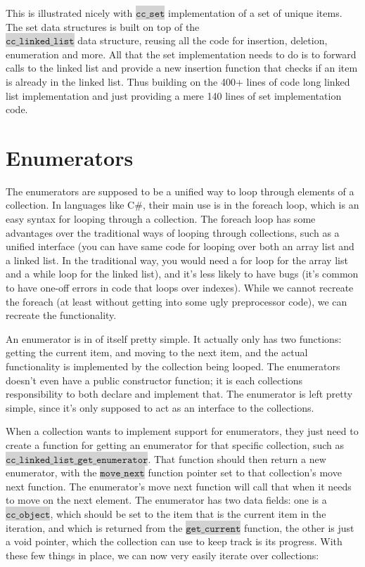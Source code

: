 \documentclass[table]{ituthesis}
\newcommand{\highlight}[1]{\colorbox{lightGray}{$\displaystyle \texttt{#1}$}}
\begin{document}
This is illustrated nicely with \highlight{cc\_set} implementation of a set of unique items. The set data structures is built on top of the \\\highlight{cc\_linked\_list} data structure, reusing all the code for insertion, deletion, enumeration and more. All that the set implementation needs to do is to forward calls to the linked list and provide a new insertion function that checks if an item is already in the linked list. Thus building on the 400+ lines of code long linked list implementation and just providing a mere 140 lines of set implementation code.

\section{Enumerators}

	The enumerators are supposed to be a unified way to loop through elements of a collection. In languages like C\#, their main use is in the foreach loop, which is an easy syntax for looping through a collection. The foreach loop has some advantages over the traditional ways of looping through collections, such as a unified interface (you can have same code for looping over both an array list and a linked list. In the traditional way, you would need a for loop for the array list and a while loop for the linked list), and it's less likely to have bugs (it's common to have one-off errors in code that loops over indexes). While we cannot recreate the foreach (at least without getting into some ugly preprocessor code), we can recreate the functionality.

	An enumerator is in of itself pretty simple. It actually only has two functions: getting the current item, and moving to the next item, and the actual functionality is implemented by the collection being looped. The enumerators doesn't even have a public constructor function; it is each collections responsibility to both declare and implement that. The enumerator is left pretty simple, since it's only supposed to act as an interface to the collections.

	When a collection wants to implement support for enumerators, they just need to create a function for getting an enumerator for that specific collection, such as \highlight{cc\_linked\_list\_get\_enumerator}. That function should then return a new enumerator, with the \highlight{move\_next} function pointer set to that collection's move next function. The enumerator's move next function will call that when it needs to move on the next element. The enumerator has two data fields: one is a \highlight{cc\_object}, which should be set to the item that is the current item in the iteration, and which is returned from the \highlight{get\_current} function, the other is just a void pointer, which the collection can use to keep track is its progress. With these few things in place, we can now very easily iterate over collections:
\end{document}
